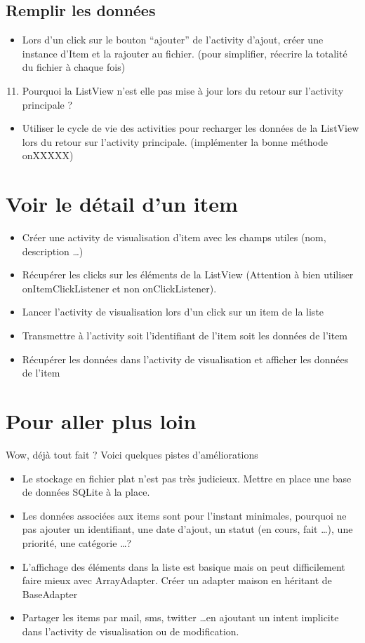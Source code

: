 \documentclass{article}
\begin{document}
 \subsection{Remplir les données}
 \begin{itemize}
  \item Lors d'un click sur le bouton ``ajouter'' de l'activity d'ajout, créer une instance d'Item et la rajouter au fichier. (pour simplifier, réecrire la totalité du fichier à chaque fois)
 \end{itemize}
  \begin{enumerate}
 \setcounter{enumi}{10}
\item Pourquoi la ListView n'est elle pas mise à jour lors du retour sur l'activity principale ?
\end{enumerate}
 \begin{itemize}
  \item Utiliser le cycle de vie des activities pour recharger les données de la ListView lors du retour sur l'activity principale. (implémenter la bonne méthode onXXXXX)
 \end{itemize}
 \section{Voir le détail d'un item}
 \begin{itemize}
  \item Créer une activity de visualisation d'item avec les champs utiles (nom, description \ldots)
  \item Récupérer les clicks sur les éléments de la ListView (Attention à bien utiliser onItemClickListener et non onClickListener).
  \item Lancer l'activity de visualisation lors d'un click sur un item de la liste
  \item Transmettre à l'activity soit l'identifiant de l'item soit les données de l'item
  \item Récupérer les données dans l'activity de visualisation et afficher les données de l'item
 \end{itemize}
 \section{Pour aller plus loin}
	Wow, déjà tout fait ? Voici quelques pistes d'améliorations
  \begin{itemize}
  \item Le stockage en fichier plat n'est pas très judicieux. Mettre en place une base de données SQLite à la place.
  \item Les données associées aux items sont pour l'instant minimales, pourquoi ne pas ajouter un identifiant, une date d'ajout, un statut (en cours, fait \ldots), une priorité, une catégorie \ldots ?
  \item L'affichage des éléments dans la liste est basique mais on peut difficilement faire mieux avec ArrayAdapter. Créer un adapter maison en héritant de BaseAdapter
  \item Partager les items par mail, sms, twitter \ldots en ajoutant un intent implicite dans l'activity de visualisation ou de modification.
 \end{itemize}
\end{document}

